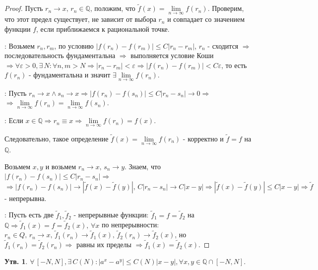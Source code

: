 \documentclass[12pt]{article}
\newcommand{\MQ}{\mathbb{Q}}
\theoremstyle{definition}
\newtheorem{prop}{Утв.}
\begin{document}
\begin{proof}
	Пусть $r_n \to x, \, r_n \in \MQ$, положим, что $\tilde{f}(x) = \lim\limits_{n\to \infty} f(r_n)$. Проверим, что этот предел существует, не зависит от выбора $r_n$ и совпадает со значением функции $f$, если приближаемся к рациональной точке.
	
	: Возьмем $r_n, r_m$, по условию $|f(r_n) - f(r_m)| \leq C|r_n - r_m|$, $r_n$ - сходится $\Rightarrow$ последовательность фундаментальна $\Rightarrow$ выполняется условие Коши $\Rightarrow \forall \varepsilon > 0, \exists \, N \colon \forall n, m > N \Rightarrow |r_n -r_m| < \varepsilon \Rightarrow |f(r_n) - f(r_m)| < C \varepsilon$, то есть $f(r_n)$ - фундаментальна и значит $\exists \lim\limits_{n \to \infty}f(r_n)$.
	
	: Пусть $r_n \to x \wedge s_n \to x \Rightarrow |f(r_n) - f(s_n)| \leq C|r_n - s_n| \to 0 \Rightarrow$ \\
	$\Rightarrow \lim\limits_{n \to \infty}f(r_n) =  \lim\limits_{n \to \infty}f(s_n)$.
	
	: Если $x \in \MQ \Rightarrow r_n \equiv x \Rightarrow \lim\limits_{n \to \infty}f(r_n) = f(x)$. 
	
	Следовательно, такое определение $\tilde{f}(x) = \lim\limits_{n\to \infty} f(r_n)$ - корректно и $\tilde{f} = f$ на $\MQ$. 
	
	Возьмем $x,y$ и возьмем $r_n \to x, \, s_n \to y$. Знаем, что $|f(r_n) - f(s_n)| \leq C|r_n - s_n| \Rightarrow$ \\ 
	$\Rightarrow |f(r_n) - f(s_n)|\to |\tilde{f}(x) - \tilde{f}(y)|, \, C|r_n -s_n| \to C|x-y| \Rightarrow |\tilde{f}(x) - \tilde{f}(y)| \leq C|x-y| \Rightarrow \tilde{f}$ - непрерывна.
	
	: Пусть есть две $\tilde{f}_1, \tilde{f}_2$ - непрерывные функции: $\tilde{f}_1 = f = \tilde{f}_2$ на $\MQ \Rightarrow \tilde{f}_1(x) = f = \tilde{f}_2(x), \, \forall x$ по непрерывности: $r_n \in Q, \, r_n \to x, \, \tilde{f}_1(r_n) \to \tilde{f}_1(x), \, \tilde{f}_2(r_n) \to \tilde{f}_2(x)$, но $\tilde{f}_1(r_n) =  \tilde{f}_2(r_n) \Rightarrow$ равны их пределы $\Rightarrow \tilde{f}_1(x) = \tilde{f}_2(x)$.
\end{proof}

\begin{prop}
	 $\forall\, [-N,N], \exists \, C(N) \colon |a^x - a^y| \leq C(N)|x-y|, \forall x,y \in \MQ \cap [-N,N]$.
\end{prop}
\end{document}
